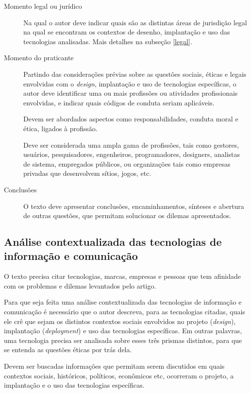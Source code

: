 \documentclass[12pt]{article}
\begin{document}
\begin{description}
		\item [Momento legal ou jurídico] Na qual o autor deve indicar quais são as distintas áreas de jurisdição legal na qual se encontram os contextos de desenho, implantação e uso das tecnologias analisadas.
		Mais detalhes na subseção \ref{legal}.
		\item [Momento do praticante]
		Partindo das considerações prévias sobre as questões sociais, éticas e legais envolvidas com o \textit{design}, implantação e uso de tecnologias específicas, o autor deve identificar uma ou mais profissões ou atividades profissionais envolvidas, e indicar quais códigos de conduta seriam aplicáveis.

		Devem ser abordados aspectos como responsabilidades, conduta moral e ética, ligados à profissão.

		Deve ser considerada uma ampla gama de profissões, tais como gestores, usuários, pesquisadores, engenheiros, programadores, designers, analistas de sistema, empregados públicos, ou organizações tais como empresas privadas que desenvolvem sítios, jogos, etc.
		\item [Conclusões] O texto deve apresentar conclusões, encaminhamentos, sínteses e abertura de outras questões, que permitam solucionar os dilemas apresentados.

	\end{description}

	\subsection{\label{tecno}Análise contextualizada das tecnologias de informação e comunicação}

	O texto precisa citar tecnologias, marcas, empresas e pessoas que tem afinidade com os problemas e dilemas levantados pelo artigo.

	Para que seja feita uma análise contextualizada das tecnologias de informação e comunicação é necessário que o autor descreva, para as tecnologias citadas, quais ele crê que sejam os distintos contextos sociais envolvidos no projeto (\textit{design}), implantação (\textit{deployment}) e uso das tecnologias específicas. Em outras palavras, uma tecnologia precisa ser analisada sobre esses três prismas distintos, para que se entenda as questões éticas por trás dela.

	Devem ser buscadas informações que permitam serem discutidos em quais contextos sociais, históricos, políticos, econômicos etc, ocorreram o projeto, a implantação e o uso das tecnologias específicas.
\end{document}
